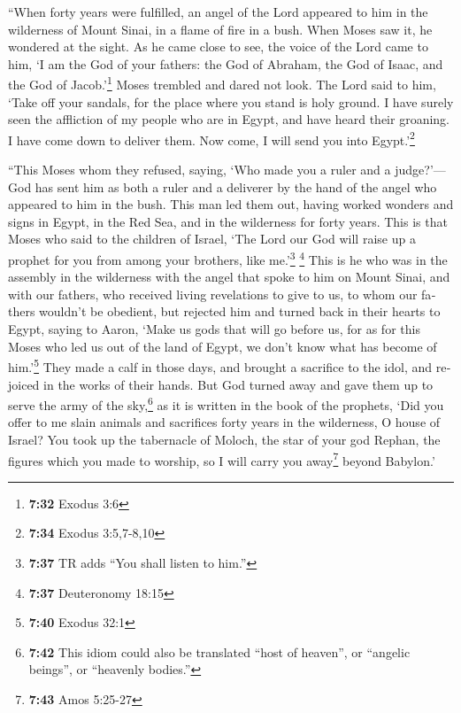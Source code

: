 \begin{paracol}{2}
\begin{otherlanguage}{english}
 ``When forty years were fulfilled, an angel of the Lord
appeared to him in the wilderness of Mount Sinai, in a flame of fire in
a bush.  When Moses saw it, he wondered at the sight. As
he came close to see, the voice of the Lord came to him, 
`I am the God of your fathers: the God of Abraham, the God of Isaac, and
the God of Jacob.'\footnote{\textbf{7:32} Exodus 3:6} Moses trembled and
dared not look.  The Lord said to him, `Take off your
sandals, for the place where you stand is holy ground.  I
have surely seen the affliction of my people who are in Egypt, and have
heard their groaning. I have come down to deliver them. Now come, I will
send you into Egypt.'\footnote{\textbf{7:34} Exodus 3:5,7-8,10}

 ``This Moses whom they refused, saying, `Who made you a
ruler and a judge?'---God has sent him as both a ruler and a deliverer
by the hand of the angel who appeared to him in the bush.
 This man led them out, having worked wonders and signs
in Egypt, in the Red Sea, and in the wilderness for forty years.
 This is that Moses who said to the children of Israel,
`The Lord our God will raise up a prophet for you from among your
brothers, like me.'\footnote{\textbf{7:37} TR adds ``You shall listen to
  him.''} \footnote{\textbf{7:37} Deuteronomy 18:15} 
This is he who was in the assembly in the wilderness with the angel that
spoke to him on Mount Sinai, and with our fathers, who received living
revelations to give to us,  to whom our fathers wouldn't
be obedient, but rejected him and turned back in their hearts to Egypt,
 saying to Aaron, `Make us gods that will go before us,
for as for this Moses who led us out of the land of Egypt, we don't know
what has become of him.'\footnote{\textbf{7:40} Exodus 32:1}
 They made a calf in those days, and brought a sacrifice
to the idol, and rejoiced in the works of their hands. 
But God turned away and gave them up to serve the army of the
sky,\footnote{\textbf{7:42} This idiom could also be translated ``host
  of heaven'', or ``angelic beings'', or ``heavenly bodies.''} as it is
written in the book of the prophets, `Did you offer to me slain animals
and sacrifices forty years in the wilderness, O house of Israel?
 You took up the tabernacle of Moloch, the star of your
god Rephan, the figures which you made to worship, so I will carry you
away\footnote{\textbf{7:43} Amos 5:25-27} beyond Babylon.'


\end{otherlanguage}
\end{paracol}
